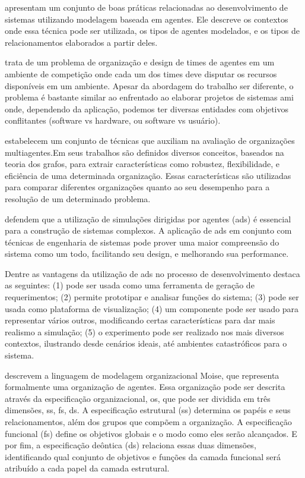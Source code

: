  apresentam um conjunto de boas práticas relacionadas ao desenvolvimento de sistemas utilizando modelagem baseada em agentes. Ele descreve os contextos onde essa técnica pode ser utilizada, os tipos de agentes modelados, e os tipos de relacionamentos elaborados a partir deles.

 trata de um problema de organização e design de times de agentes em um ambiente de competição onde cada um dos times deve disputar os recursos disponíveis em um ambiente. Apesar da abordagem do trabalho ser diferente, o problema é bastante similar ao enfrentado ao elaborar projetos de sistemas \acrshort{ami} onde, dependendo da aplicação, podemos ter diversas entidades com objetivos conflitantes (software vs hardware, ou software vs usuário).

 estabelecem um conjunto de técnicas que auxiliam na avaliação de organizações multiagentes.Em seus trabalhos são definidos diversos conceitos, baseados na teoria dos grafos, para extrair características como robustez, flexibilidade, e eficiência de uma determinada organização. Essas características são utilizadas para comparar diferentes organizações quanto ao seu desempenho para a resolução de um determinado problema.

 defendem que a utilização de simulações dirigidas por agentes (\acrshort{ads}) é essencial para a construção de sistemas complexos. A aplicação de \acrshort{ads} em conjunto com técnicas de engenharia de sistemas pode prover uma maior compreensão do sistema como um todo, facilitando seu design, e melhorando sua performance. 

Dentre as vantagens da utilização de \acrshort{ads} no processo de desenvolvimento  destaca as seguintes: (1) pode ser usada como uma ferramenta de geração de requerimentos; (2) permite prototipar e analisar funções do sistema; (3) pode ser usada como plataforma de visualização; (4) um componente pode ser usado para representar vários outros, modificando certas características para dar mais realismo a simulação; (5) o experimento pode ser realizado nos mais diversos contextos, ilustrando desde cenários ideais, até ambientes catastróficos para o sistema. 

 descrevem a linguagem de modelagem organizacional Moise, que representa formalmente uma organização de agentes. Essa organização pode ser descrita através da especificação organizacional, \acrfull{os}, que pode ser dividida em três dimensões, \acrfull{ss}, \acrfull{fs}, \acrfull{ds}. A especificação estrutural (\acrshort{ss}) determina os papéis e seus relacionamentos, além dos grupos que compõem a organização. A especificação funcional (\acrshort{fs}) define os objetivos globais e o modo como eles serão alcançados. E por fim, a especificação deôntica (\acrshort{ds}) relaciona essas duas dimensões, identificando qual conjunto de objetivos e funções da camada funcional será atribuído a cada papel da camada estrutural. 

